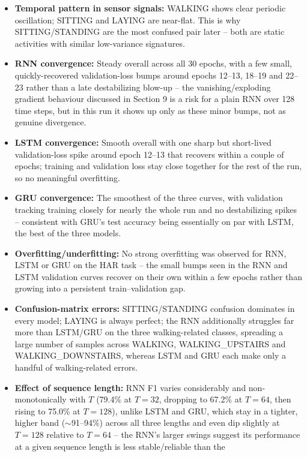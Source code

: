 \documentclass[10pt]{article}
\begin{document}
\begin{itemize}
\item \textbf{Temporal pattern in sensor signals:} WALKING shows clear
periodic oscillation; SITTING and LAYING are near-flat. This is why
SITTING/STANDING are the most confused pair later -- both are static
activities with similar low-variance signatures.
\item \textbf{RNN convergence:} Steady overall across all 30 epochs, with a
few small, quickly-recovered validation-loss bumps around epochs 12--13,
18--19 and 22--23 rather than a late destabilizing blow-up -- the
vanishing/exploding gradient behaviour discussed in Section 9 is a risk for
a plain RNN over 128 time steps, but in this run it shows up only as these
minor bumps, not as genuine divergence.
\item \textbf{LSTM convergence:} Smooth overall with one sharp but
short-lived validation-loss spike around epoch 12--13 that recovers within a
couple of epochs; training and validation loss stay close together for the
rest of the run, so no meaningful overfitting.
\item \textbf{GRU convergence:} The smoothest of the three curves, with
validation tracking training closely for nearly the whole run and no
destabilizing spikes -- consistent with GRU's test accuracy being
essentially on par with LSTM, the best of the three models.
\item \textbf{Overfitting/underfitting:} No strong overfitting was observed
for RNN, LSTM or GRU on the HAR task -- the small bumps seen in the RNN and
LSTM validation curves recover on their own within a few epochs rather than
growing into a persistent train--validation gap.
\item \textbf{Confusion-matrix errors:} SITTING/STANDING confusion
dominates in every model; LAYING is always perfect; the RNN additionally
struggles far more than LSTM/GRU on the three walking-related classes,
spreading a large number of samples across WALKING, WALKING\_UPSTAIRS and
WALKING\_DOWNSTAIRS, whereas LSTM and GRU each make only a handful of
walking-related errors.
\item \textbf{Effect of sequence length:} RNN F1 varies considerably and
non-monotonically with $T$ (79.4\% at $T=32$, dropping to 67.2\% at $T=64$,
then rising to 75.0\% at $T=128$), unlike LSTM and GRU, which stay in a
tighter, higher band ($\sim$91--94\%) across all three lengths and even dip
slightly at $T=128$ relative to $T=64$ -- the RNN's larger swings suggest
its performance at a given sequence length is less stable/reliable than the

\end{itemize}
\end{document}
